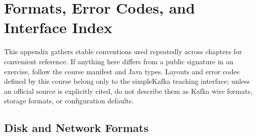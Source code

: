 \chapter{Formats, Error Codes, and Interface Index}
This appendix gathers stable conventions used repeatedly across chapters for convenient reference. If anything here differs from a public signature in an exercise, follow the course manifest and Java types. Layouts and error codes defined by this course belong only to the simpleKafka teaching interface; unless an official source is explicitly cited, do not describe them as Kafka wire formats, storage formats, or configuration defaults.

\section{Disk and Network Formats}

